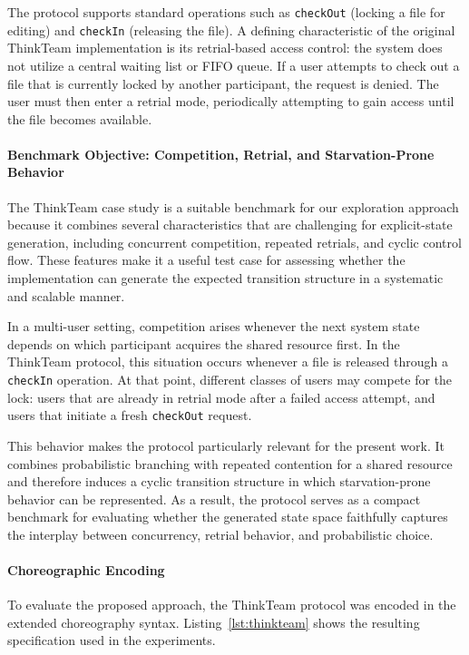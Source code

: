The protocol supports standard operations such as \texttt{checkOut} (locking a file for editing) and \texttt{checkIn} (releasing the file). A defining characteristic of the original ThinkTeam implementation is its retrial-based access control: the system does not utilize a central waiting list or FIFO queue. If a user attempts to check out a file that is currently locked by another participant, the request is denied. The user must then enter a retrial mode, periodically attempting to gain access until the file becomes available.

\paragraph{Benchmark Objective: Competition, Retrial, and Starvation-Prone Behavior}
The ThinkTeam case study is a suitable benchmark for our exploration approach because it combines several characteristics that are challenging for explicit-state generation, including concurrent competition, repeated retrials, and cyclic control flow. These features make it a useful test case for assessing whether the implementation can generate the expected transition structure in a systematic and scalable manner.

In a multi-user setting, competition arises whenever the next system state depends on which participant acquires the shared resource first. In the ThinkTeam protocol, this situation occurs whenever a file is released through a \texttt{checkIn} operation. At that point, different classes of users may compete for the lock: users that are already in retrial mode after a failed access attempt, and users that initiate a fresh \texttt{checkOut} request.

This behavior makes the protocol particularly relevant for the present work. It combines probabilistic branching with repeated contention for a shared resource and therefore induces a cyclic transition structure in which starvation-prone behavior can be represented. As a result, the protocol serves as a compact benchmark for evaluating whether the generated state space faithfully captures the interplay between concurrency, retrial behavior, and probabilistic choice.

\paragraph{Choreographic Encoding}
To evaluate the proposed approach, the ThinkTeam protocol was encoded in the extended choreography syntax. Listing~\ref{lst:thinkteam} shows the resulting specification used in the experiments. 

